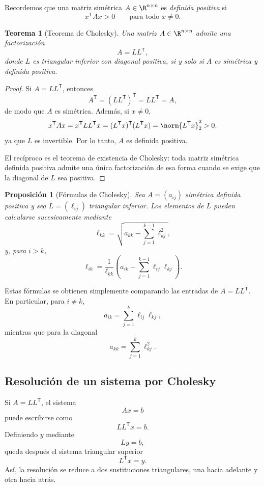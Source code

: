 \documentclass[12pt]{article}
\newtheorem{teorema}{Teorema}
\newtheorem{proposicion}{Proposición}
\begin{document}
Recordemos que una matriz simétrica $A\in\R^{n\times n}$ es \emph{definida positiva} si
\[
    x^{\mathsf T}Ax>0
    \qquad\text{para todo }x\neq0.
\]

\begin{teorema}[Teorema de Cholesky]
Una matriz $A\in\R^{n\times n}$ admite una factorización
\[
    A=LL^{\mathsf T},
\]
donde $L$ es triangular inferior con diagonal positiva, si y solo si $A$ es simétrica y definida positiva.
\end{teorema}

\begin{proof}
Si $A=LL^{\mathsf T}$, entonces
\[
    A^{\mathsf T}=(LL^{\mathsf T})^{\mathsf T}=LL^{\mathsf T}=A,
\]
de modo que $A$ es simétrica. Además, si $x\neq0$,
\[
    x^{\mathsf T}Ax
    =x^{\mathsf T}LL^{\mathsf T}x
    =(L^{\mathsf T}x)^{\mathsf T}(L^{\mathsf T}x)
    =\norm{L^{\mathsf T}x}_2^2>0,
\]
ya que $L$ es invertible. Por lo tanto, $A$ es definida positiva.

El recíproco es el teorema de existencia de Cholesky: toda matriz simétrica definida positiva admite una única factorización de esa forma cuando se exige que la diagonal de $L$ sea positiva.
\end{proof}

\begin{proposicion}[Fórmulas de Cholesky]
Sea $A=(a_{ij})$ simétrica definida positiva y sea $L=(\ell_{ij})$ triangular inferior. Los elementos de $L$ pueden calcularse sucesivamente mediante
\[
    \ell_{kk}
    =
    \sqrt{a_{kk}-\sum_{j=1}^{k-1}\ell_{kj}^2},
\]
y, para $i>k$,
\[
    \ell_{ik}
    =
    \frac{1}{\ell_{kk}}
    \left(
        a_{ik}-\sum_{j=1}^{k-1}\ell_{ij}\ell_{kj}
    \right).
\]
\end{proposicion}

Estas fórmulas se obtienen simplemente comparando las entradas de $A=LL^{\mathsf T}$. En particular, para $i\neq k$,
\[
    a_{ik}=\sum_{j=1}^{k}\ell_{ij}\ell_{kj},
\]
mientras que para la diagonal
\[
    a_{kk}=\sum_{j=1}^{k}\ell_{kj}^2.
\]

\subsection*{Resolución de un sistema por Cholesky}

Si $A=LL^{\mathsf T}$, el sistema
\[
    Ax=b
\]
puede escribirse como
\[
    LL^{\mathsf T}x=b.
\]
Definiendo $y$ mediante
\[
    Ly=b,
\]
queda después el sistema triangular superior
\[
    L^{\mathsf T}x=y.
\]
Así, la resolución se reduce a dos sustituciones triangulares, una hacia adelante y otra hacia atrás.
\end{document}
